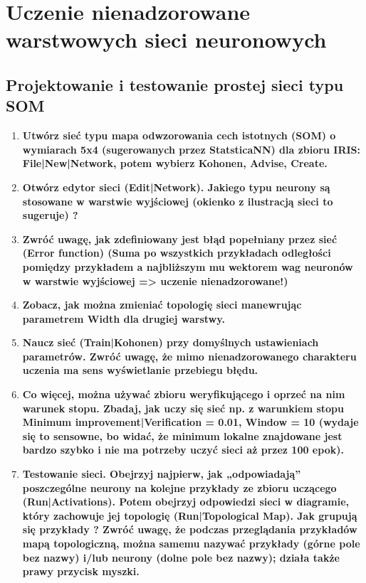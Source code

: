 
\section{Uczenie nienadzorowane warstwowych sieci neuronowych}

\subsection{Projektowanie i testowanie prostej sieci typu SOM}

\begin{enumerate}
\item \textbf{Utwórz sieć typu mapa odwzorowania cech istotnych (SOM) o wymiarach 5x4 (sugerowanych przez StatsticaNN) dla zbioru IRIS: File|New|Network, potem wybierz Kohonen, Advise, Create.}

\item \textbf{
Otwórz edytor sieci (Edit|Network). Jakiego typu neurony są stosowane w warstwie wyjściowej (okienko z ilustracją sieci to sugeruje) ?}

\item \textbf{
Zwróć uwagę, jak zdefiniowany jest błąd popełniany przez sieć (Error function) (Suma po wszystkich przykładach odległości pomiędzy przykładem a najbliższym mu wektorem wag neuronów w warstwie wyjściowej => uczenie nienadzorowane!)}

\item \textbf{
Zobacz, jak można zmieniać topologię sieci manewrując parametrem Width dla drugiej warstwy.}

\item \textbf{
Naucz sieć (Train|Kohonen) przy domyślnych ustawieniach parametrów. Zwróć uwagę, że mimo nienadzorowanego charakteru uczenia ma sens wyświetlanie przebiegu błędu.}

\item \textbf{
Co więcej, można używać zbioru weryfikującego i oprzeć na nim warunek stopu. Zbadaj, jak uczy się sieć np. z warunkiem stopu Minimum improvement|Verification = 0.01, Window = 10 (wydaje się to sensowne, bo widać, że minimum lokalne znajdowane jest bardzo szybko i nie ma potrzeby uczyć sieci aż przez 100 epok).}

\item \textbf{
Testowanie sieci. Obejrzyj najpierw, jak „odpowiadają” poszczególne neurony na kolejne przykłady ze zbioru uczącego (Run|Activations). Potem obejrzyj odpowiedzi sieci w diagramie, który zachowuje jej topologię (Run|Topological Map).  Jak grupują się przykłady ?
Zwróć uwagę, że podczas przeglądania przykładów mapą topologiczną, można samemu nazywać przykłady (górne pole bez nazwy) i/lub neurony (dolne pole bez nazwy); działa także prawy przycisk myszki.}


\end{enumerate}

